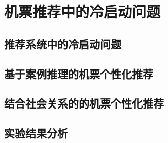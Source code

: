 
\chapter{机票推荐中的冷启动问题}
\label{chap:cold}

\section{推荐系统中的冷启动问题}

\section{基于案例推理的机票个性化推荐}

\section{结合社会关系的的机票个性化推荐}

\section{实验结果分析}